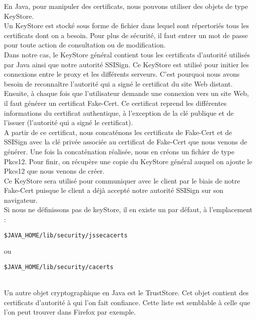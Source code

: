 En Java, pour manipuler des certificats, nous pouvons utiliser des objets de type KeyStore.
~~\\

Un KeyStore est stocké sous forme de fichier dans lequel sont répertoriés tous les certificats dont on a besoin. Pour plus de sécurité, il faut entrer un mot de passe pour toute action de consultation ou de modification.
~~\\

Dans notre cas, le KeyStore général contient tous les certificats d'autorité utilisés par Java ainsi que notre autorité SSISign. Ce KeyStore est utilisé pour initier les connexions entre le proxy et les différents serveurs. C'est pourquoi nous avons besoin de reconnaître l'autorité qui a signé le certificat du site Web distant.
~~\\

Ensuite, à chaque fois que l'utilisateur demande une connexion vers un site Web, il faut générer un certificat Fake-Cert. Ce certificat reprend les différentes informations du certificat authentique, à l'exception de la clé publique et de l'issuer (l'autorité qui a signé le certificat).
~~\\

A partir de ce certificat, nous concaténons les certificats de Fake-Cert et de SSISign avec la clé privée associée au certificat de Fake-Cert que nous venons de générer. Une fois la concaténation réalisée, nous en créons un fichier de type Pkcs12.
Pour finir, on récupère une copie du KeyStore général auquel on ajoute le Pkcs12 que nous venons de créer.
~~\\

Ce KeyStore sera utilisé pour communiquer avec le client par le biais de notre Fake-Cert puisque le client a déjà accepté notre autorité SSISign sur son navigateur.
~~\\

Si nous ne définissons pas de keyStore, il en existe un par défaut, à l'emplacement :
\begin{verbatim}
$JAVA_HOME/lib/security/jssecacerts
\end{verbatim}
ou
\begin{verbatim}
$JAVA_HOME/lib/security/cacerts
\end{verbatim}
~~\\

Un autre objet cryptographique en Java est le TrustStore. Cet objet contient des certificats d'autorité à qui l'on fait confiance. Cette liste est semblable à celle que l'on peut trouver dans Firefox par exemple.
~~\\


